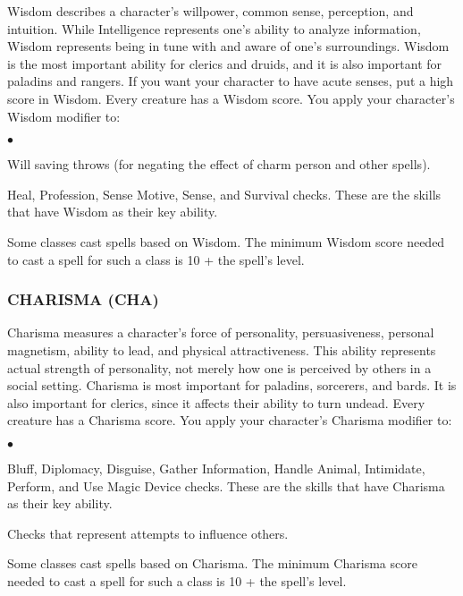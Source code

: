 Wisdom describes a character's willpower, common sense, perception, and intuition. While Intelligence represents one's ability to analyze information, Wisdom represents being in tune with and aware of one's surroundings. Wisdom is the most important ability for clerics and druids, and it is also important for paladins and rangers. If you want your character to have acute senses, put a high score in Wisdom. Every creature has a Wisdom score.
You apply your character's Wisdom modifier to:
\begin{list}{$\bullet$}{\itemspace}
	\item Will saving throws (for negating the effect of charm person and other spells).
	\item Heal, Profession, Sense Motive, Sense, and Survival checks. These are the skills that have Wisdom as their key ability.
	\item Some classes cast spells based on Wisdom.  The minimum Wisdom score needed to cast a spell for such a class is 10 + the spell's level.
\end{list}

\subsubsection{CHARISMA (CHA)}

Charisma measures a character's force of personality, persuasiveness, personal magnetism, ability to lead, and physical attractiveness. This ability represents actual strength of personality, not merely how one is perceived by others in a social setting. Charisma is most important for paladins, sorcerers, and bards. It is also important for clerics, since it affects their ability to turn undead. Every creature has a Charisma score.
You apply your character's Charisma modifier to:
\begin{list}{$\bullet$}{\itemspace}
	\item Bluff, Diplomacy, Disguise, Gather Information, Handle Animal, Intimidate, Perform, and Use Magic Device checks. These are the skills that have Charisma as their key ability.
	\item Checks that represent attempts to influence others.
	\item Some classes cast spells based on Charisma.  The minimum Charisma score needed to cast a spell for such a class is 10 + the spell's level.
\end{list}

\vspace*{15pt}

